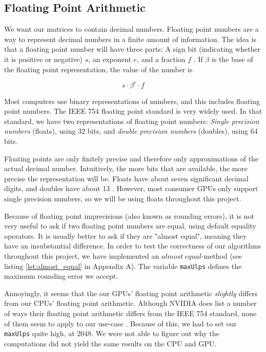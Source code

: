 \subsection{Floating Point Arithmetic}

We want our matrices to contain decimal numbers. Floating point numbers are a way to represent decimal numbers in a finite amount of information. The idea is that a floating point number will have three parts: A sign bit (indicating whether it is positive or negative) $s$, an exponent $e$, and a fraction $f$ \cite[Sect. 6]{afternotes}. If $\beta$ is the base of the floating point representation, the value of the number is

\[s \cdot \beta^e \cdot f\]

Most computers use binary representations of numbers, and this includes floating point numbers. The IEEE 754 floating point standard is very widely used. In that standard, we have two representations of floating point numbers: \textit{Single precision numbers} (floats), using 32 bits, and \textit{double precision numbers} (doubles), using 64 bits. 

Floating points are only finitely precise and therefore only approximations of the actual decimal number. Intuitively, the more bits that are available, the more precise the representation will be. Floats have about seven significant decimal digits, and doubles have about 13 \cite[Sect. 6]{afternotes}. However, most consumer GPUs only support single precision numbers, so we will be using floats throughout this project.

Because of floating point imprecisions (also known as rounding errors), it is not very useful to ask if two floating point numbers are equal, using default equality operators. It is usually better to ask if they are "almost equal", meaning they have an insubstantial difference. In order to test the correctness of our algorithms throughout this project, we have implemented an $almost\ equal$-method (see listing \ref{lst:almost_equal} in Appendix A). The variable \texttt{maxUlps} defines the maximum rounding error we accept.

Annoyingly, it seems that the our GPUs' floating point arithmetic \textit{slightly} differs from our CPUs' floating point arithmetic. Although NVIDIA does list a number of ways their floating point arithmetic differs from the IEEE 754 standard, none of them seem to apply to our use-case \cite[Sect. 13.1]{nvidia:cudadoc}. Because of this, we had to set our \texttt{maxUlps} quite high, at 2048. We were not able to figure out why the computations did not yield the same results on the CPU and GPU.\\

